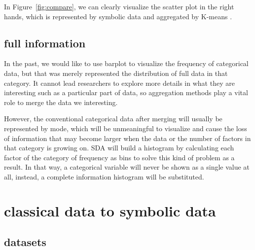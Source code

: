 \documentclass[article]{jss}
\begin{document}
In Figure~\ref{fig:compare}, we can clearly visualize the scatter plot in the right hands, which is represented by symbolic data and aggregated by K-means \cite{macqueen:1967}. 


\subsection{full information}

In the past, we would like to use barplot to visualize the frequency of categorical data, but that was merely represented the distribution of full data in that category. It cannot lead researchers to explore more details in what they are interesting such as a particular part of data, so aggregation methods play a vital role to merge the data we interesting.

However, the conventional categorical data after merging will usually be represented by mode, which will be unmeaningful to visualize and cause the loss of information that may become larger when the data or the number of factors in that category is growing on. SDA will build a histogram by calculating each factor of the category of frequency as bins to solve this kind of problem as a result. In that way, a categorical variable will never be shown as a single value at all, instead, a complete information histogram will be substituted.


\section{classical data to symbolic data}

\subsection{datasets}
\end{document}
